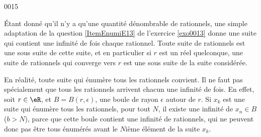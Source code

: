 
\begin{corrige}{0015}

Étant donné qu'il n'y a qu'une quantité dénombrable de rationnels, une simple adaptation de la question \ref{ItemEnumiE13} de l'exercice \ref{exo0013} donne une suite qui contient une infinité de fois chaque rationnel. Toute suite de rationnels est une sous suite de cette suite, et en particulier si $r$ est un réel quelconque, une suite de rationnels qui converge vers $r$ est une sous suite de la suite considérée.

\begin{alternative}
En réalité, toute suite qui énumère tous les rationnels convient. Il ne faut pas spécialement que tous les rationnels arrivent chacun une infinité de fois. En effet, soit $r\in\eR$, et $B=B(r,\epsilon)$, une boule de rayon $\epsilon$ autour de $r$. Si $x_k$ est une suite qui énumère tous les rationnels, pour tout $N$, il existe une infinité de $x_n\in B$ ($b>N$), parce que cette boule contient une infinité de rationnels, qui ne peuvent donc pas être tous énumérés avant le $N$ième élément de la suite $x_k$.
\end{alternative}

\end{corrige}
